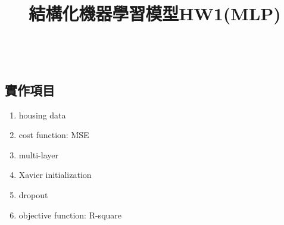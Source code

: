 \documentclass[conference,twocolumn]{IEEEtran}
\theoremstyle{definition}
\begin{document}
\title{結構化機器學習模型HW1(MLP)}
\author{\\
		    }
	\maketitle	
	\begin{singlespace}
	\IEEEpeerreviewmaketitle
\section{實作項目}
\begin{enumerate}
\item housing data
\item cost function: MSE
\item multi-layer
\item Xavier initialization
\item dropout
\item objective function: R-square
\end{enumerate}

\end{singlespace}
\end{document}
